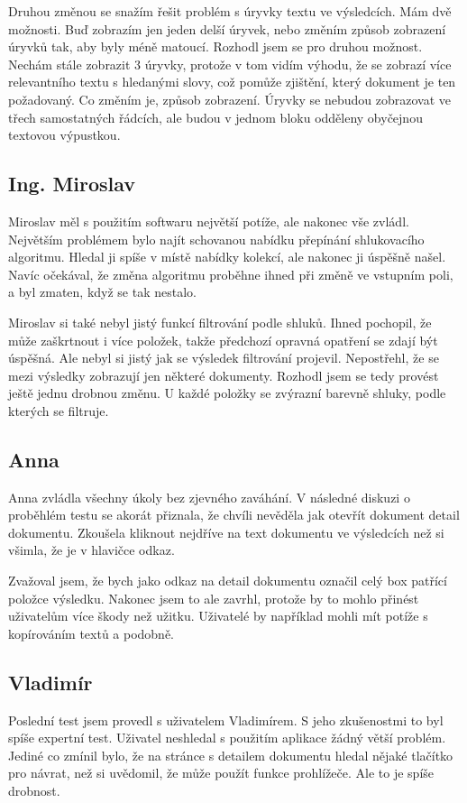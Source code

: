 Druhou změnou se snažím řešit problém s úryvky textu ve výsledcích. Mám dvě možnosti. Buď zobrazím jen jeden delší úryvek, nebo změním způsob zobrazení úryvků tak, aby byly méně matoucí. Rozhodl jsem se pro druhou možnost. Nechám stále zobrazit 3 úryvky, protože v tom vidím výhodu, že se zobrazí více relevantního textu s hledanými slovy, což pomůže zjištění, který dokument je ten požadovaný. Co změním je, způsob zobrazení. Úryvky se nebudou zobrazovat ve třech samostatných řádcích, ale budou v jednom bloku odděleny obyčejnou textovou výpustkou.

\subsection{Ing. Miroslav}
Miroslav měl s použitím softwaru největší potíže, ale nakonec vše zvládl. Největším problémem bylo najít schovanou nabídku přepínání shlukovacího algoritmu. Hledal ji spíše v místě nabídky kolekcí, ale nakonec ji úspěšně našel. Navíc očekával, že změna algoritmu proběhne ihned při změně ve vstupním poli, a byl zmaten, když se tak nestalo.

Miroslav si také nebyl jistý funkcí filtrování podle shluků. Ihned pochopil, že může zaškrtnout i více položek, takže předchozí opravná opatření se zdají být úspěšná. Ale nebyl si jistý jak se výsledek filtrování projevil. Nepostřehl, že se mezi výsledky zobrazují jen některé dokumenty. Rozhodl jsem se tedy provést ještě jednu drobnou změnu. U každé položky se zvýrazní barevně shluky, podle kterých se filtruje.

\subsection{Anna}
Anna zvládla všechny úkoly bez zjevného zaváhání. V následné diskuzi o proběhlém testu se akorát přiznala, že chvíli nevěděla jak otevřít dokument detail dokumentu. Zkoušela kliknout nejdříve na text dokumentu ve výsledcích než si všimla, že je v hlavičce odkaz.

Zvažoval jsem, že bych jako odkaz na detail dokumentu označil celý box patřící položce výsledku. Nakonec jsem to ale zavrhl, protože by to mohlo přinést uživatelům více škody než užitku. Uživatelé by například mohli mít potíže s kopírováním textů a podobně.

\subsection{Vladimír}
Poslední test jsem provedl s uživatelem Vladimírem. S jeho zkušenostmi to byl spíše expertní test. Uživatel neshledal s použitím aplikace žádný větší problém. Jediné co zmínil bylo, že na stránce s detailem dokumentu hledal nějaké tlačítko pro návrat, než si uvědomil, že může použít funkce prohlížeče. Ale to je spíše drobnost.

